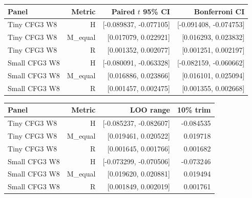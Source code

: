 {\small\setlength{\tabcolsep}{3pt}
\begin{tabular}{lrrr}
\hline
Panel & Metric & Paired $t$ 95\% CI & Bonferroni CI \\
\hline
Tiny CFG3 W8 & H & [-0.089837, -0.077105] & [-0.091408, -0.074753] \\
Tiny CFG3 W8 & M\_equal & [0.017079, 0.022921] & [0.016293, 0.023832] \\
Tiny CFG3 W8 & R & [0.001352, 0.002077] & [0.001251, 0.002197] \\
Small CFG3 W8 & H & [-0.080091, -0.063328] & [-0.082159, -0.060662] \\
Small CFG3 W8 & M\_equal & [0.016886, 0.023866] & [0.016101, 0.025094] \\
Small CFG3 W8 & R & [0.001457, 0.002475] & [0.001355, 0.002668] \\
\hline
\end{tabular}
}
\par\medskip
{\small\setlength{\tabcolsep}{3pt}
\begin{tabular}{lrrr}
\hline
Panel & Metric & LOO range & 10\% trim \\
\hline
Tiny CFG3 W8 & H & [-0.085237, -0.082607] & -0.084535 \\
Tiny CFG3 W8 & M\_equal & [0.019461, 0.020522] & 0.019718 \\
Tiny CFG3 W8 & R & [0.001645, 0.001766] & 0.001682 \\
Small CFG3 W8 & H & [-0.073299, -0.070506] & -0.073246 \\
Small CFG3 W8 & M\_equal & [0.019620, 0.020881] & 0.019494 \\
Small CFG3 W8 & R & [0.001849, 0.002019] & 0.001761 \\
\hline
\end{tabular}
}
